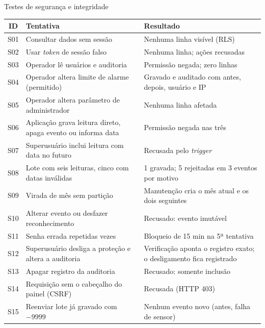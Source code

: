\begin{quadro}[htb]
  \caption{Testes de segurança e integridade}\label{qua:testes-seg}
  \scriptsize
  \begin{tabularx}{\textwidth}{|c|Y|Y|}
    \hline
    \textbf{ID} & \textbf{Tentativa} & \textbf{Resultado} \\ \hline
    S01 & Consultar dados sem sessão & Nenhuma linha visível (RLS) \\ \hline
    S02 & Usar \textit{token} de sessão falso & Nenhuma linha; ações recusadas \\ \hline
    S03 & Operador lê usuários e auditoria & Permissão negada; zero linhas \\ \hline
    S04 & Operador altera limite de alarme (permitido) & Gravado e auditado com antes, depois, usuário e IP \\ \hline
    S05 & Operador altera parâmetro de administrador & Nenhuma linha afetada \\ \hline
    S06 & Aplicação grava leitura direto, apaga evento ou informa data & Permissão negada nas três \\ \hline
    S07 & Superusuário inclui leitura com data no futuro & Recusada pelo \textit{trigger} \\ \hline
    S08 & Lote com seis leituras, cinco com datas inválidas & 1 gravada; 5 rejeitadas em 3 eventos por motivo \\ \hline
    S09 & Virada de mês sem partição & Manutenção cria o mês atual e os dois seguintes \\ \hline
    S10 & Alterar evento ou desfazer reconhecimento & Recusado: evento imutável \\ \hline
    S11 & Senha errada repetidas vezes & Bloqueio de 15 min na 5ª tentativa \\ \hline
    S12 & Superusuário desliga a proteção e altera a auditoria & Verificação aponta o registro exato; o desligamento fica registrado \\ \hline
    S13 & Apagar registro da auditoria & Recusado: somente inclusão \\ \hline
    S14 & Requisição sem o cabeçalho do painel (CSRF) & Recusada (HTTP 403) \\ \hline
    S15 & Reenviar lote já gravado com $-9999$ & Nenhum evento novo (antes, falha de sensor) \\ \hline
  \end{tabularx}
\end{quadro}


